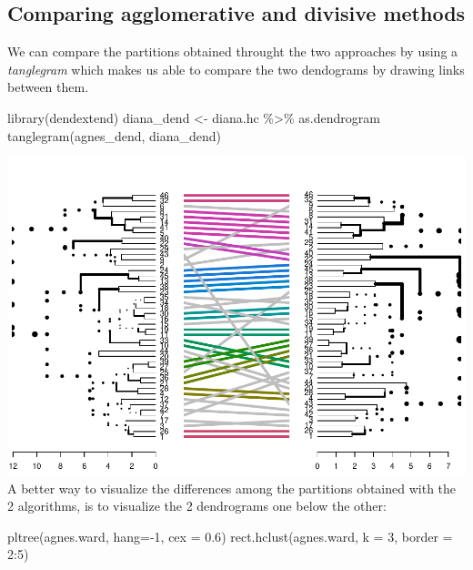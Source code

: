 \documentclass[
]{article}
\newenvironment{Shaded}{\begin{snugshade}}{\end{snugshade}}
\newcommand{\AttributeTok}[1]{\textcolor[rgb]{0.77,0.63,0.00}{#1}}
\newcommand{\DecValTok}[1]{\textcolor[rgb]{0.00,0.00,0.81}{#1}}
\newcommand{\FloatTok}[1]{\textcolor[rgb]{0.00,0.00,0.81}{#1}}
\newcommand{\FunctionTok}[1]{\textcolor[rgb]{0.00,0.00,0.00}{#1}}
\newcommand{\NormalTok}[1]{#1}
\newcommand{\OtherTok}[1]{\textcolor[rgb]{0.56,0.35,0.01}{#1}}
\newcommand{\SpecialCharTok}[1]{\textcolor[rgb]{0.00,0.00,0.00}{#1}}
\begin{document}
\hypertarget{comparing-agglomerative-and-divisive-methods}{%
\subsection{Comparing agglomerative and divisive
methods}\label{comparing-agglomerative-and-divisive-methods}}

We can compare the partitions obtained throught the two approaches by
using a \emph{tanglegram} which makes us able to compare the two
dendograms by drawing links between them.

\begin{Shaded}
\begin{Highlighting}[]
\FunctionTok{library}\NormalTok{(dendextend)}
\NormalTok{diana\_dend }\OtherTok{\textless{}{-}}\NormalTok{ diana.hc }\SpecialCharTok{\%\textgreater{}\%}\NormalTok{ as.dendrogram}
\FunctionTok{tanglegram}\NormalTok{(agnes\_dend, diana\_dend)}
\end{Highlighting}
\end{Shaded}

\includegraphics{clustering_files/figure-latex/unnamed-chunk-45-1.pdf} A
better way to visualize the differences among the partitions obtained
with the 2 algorithms, is to visualize the 2 dendrograms one below the
other:

\begin{Shaded}
\begin{Highlighting}[]
\FunctionTok{pltree}\NormalTok{(agnes.ward, }\AttributeTok{hang=}\SpecialCharTok{{-}}\DecValTok{1}\NormalTok{, }\AttributeTok{cex =} \FloatTok{0.6}\NormalTok{)}
\FunctionTok{rect.hclust}\NormalTok{(agnes.ward, }\AttributeTok{k =} \DecValTok{3}\NormalTok{, }\AttributeTok{border =} \DecValTok{2}\SpecialCharTok{:}\DecValTok{5}\NormalTok{)}
\end{Highlighting}
\end{Shaded}
\end{document}
